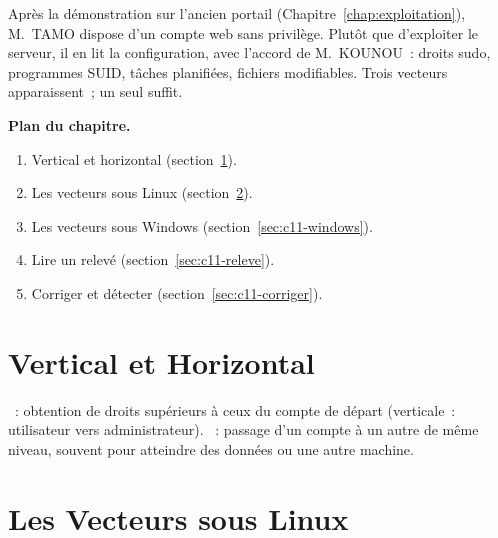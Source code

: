 Après la démonstration sur l'ancien portail (Chapitre~\ref{chap:exploitation}),
M.~TAMO dispose d'un compte web sans privilège. Plutôt que d'exploiter le
serveur, il en lit la configuration, avec l'accord de M.~KOUNOU~: droits
sudo, programmes SUID, tâches planifiées, fichiers modifiables. Trois
vecteurs apparaissent~; un seul suffit.

\medskip
\textbf{Plan du chapitre.}
\begin{enumerate}
    \item Vertical et horizontal (section~\ref{sec:c11-types}).
    \item Les vecteurs sous Linux (section~\ref{sec:c11-linux}).
    \item Les vecteurs sous Windows (section~\ref{sec:c11-windows}).
    \item Lire un relevé (section~\ref{sec:c11-releve}).
    \item Corriger et détecter (section~\ref{sec:c11-corriger}).
\end{enumerate}

\separateur

\section{Vertical et Horizontal}
\label{sec:c11-types}

\begin{boxdef}
~: obtention de droits supérieurs à ceux
du compte de départ (verticale~: utilisateur vers administrateur).
~: passage d'un compte à un autre de même
niveau, souvent pour atteindre des données ou une autre machine.
\end{boxdef}

\section{Les Vecteurs sous Linux}
\label{sec:c11-linux}

